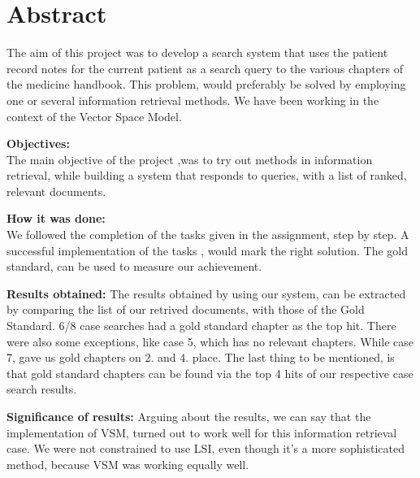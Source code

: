 \chapter{Abstract}
The aim of this project was to develop a search system that uses the patient record notes for the current patient as a search query to the various chapters of the medicine handbook. This problem, would preferably be solved by employing one or several information retrieval methods. We have been working in the context of the Vector Space Model.

\begin{description}
\item{\textbf{Objectives:}} \\
The main objective of the project ,was to try out methods in information retrieval, while building a system that responds to queries, with a list of ranked, relevant documents.
\item{\textbf{How it was done:}} \\
We followed the completion of the tasks given in the assignment, step by step. A successful implementation of the tasks , would mark the right solution. The gold standard, can be used to measure our achievement. 
\item{\textbf{Results obtained:}}
The results obtained by using our system, can be extracted by comparing the list of our retrived documents, with those of the Gold Standard.  6/8 case searches had a gold standard chapter as the top hit. There were also some exceptions, like case 5, which has no relevant chapters. While case 7, gave us gold chapters on 2. and 4. place. The last thing to be mentioned, is that gold standard chapters can be found via the top  4 hits of our respective case search results.
\item{\textbf{Significance of results:}}
Arguing about the results, we can say that the implementation of VSM, turned out to work well for this information retrieval case. We were not constrained to use LSI, even though it’s a more sophisticated method, because VSM was working equally well. 
\end{description}